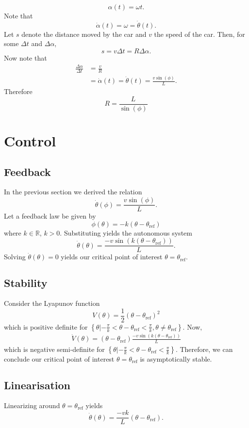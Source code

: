 \documentclass[11pt,titlepage]{report}
\begin{document}
\[
	\alpha(t) = \omega t.
\]
Note that
\[
	\dot{\alpha}(t) = \omega = \dot{\theta}(t).
\]
Let $s$ denote the distance moved by the car and $v$ the speed of the car. Then, for some $\Delta t$ and $\Delta \alpha$,
\[
	s = v \Delta t = R \Delta \alpha.
\]
Now note that
\begin{align*}
	\frac{\Delta \alpha}{\Delta t} &= \frac{v}{R} \\
	&=\dot{\alpha}(t)=\dot{\theta}(t) = \frac{v \sin{(\phi)}}{L}.
\end{align*}
Therefore
\begin{equation} \label{eq:steering-radius}
	R = \frac{L}{\sin{(\phi)}}
\end{equation}

\section*{Control}
\subsection*{Feedback}
In the previous section we derived the relation
\[
	\dot{\theta}(\phi) = \frac{v \sin{(\phi)}}{L}.
\]
Let a feedback law be given by
\[
	\phi(\theta) = -k(\theta-\theta_{\text{ref}})
\]
where $k \in \mathbb{R}$, $k > 0$. Substituting yields the autonomous system
\[
	\dot{\theta}(\theta) = \frac{- v \sin{(k (\theta-\theta_{\text{ref}}))}}{L}.
\]
Solving $\dot{\theta}(\theta)=0$ yields our critical point of interest $\theta=\theta_{\text{ref}}$.

\subsection*{Stability}
Consider the Lyapunov function
\[
	V(\theta) = \frac{1}{2}(\theta-\theta_{\text{ref}})^2
\]
which is positive definite for $\left\{\theta | -\frac{\pi}{k} < \theta-\theta_{\text{ref}} < \frac{\pi}{k}, \theta \neq \theta_{\text{ref}} \right\}$. Now,
\begin{align*}
	\dot{V}(\theta) = (\theta-\theta_{\text{ref}}) \frac{- v \sin{(k ({\theta-\theta_{\text{ref}}}))}}{L}
\end{align*}
which is negative semi-definite for $\left\{\theta | -\frac{\pi}{k} < \theta-\theta_{\text{ref}} < \frac{\pi}{k}\right\}$. Therefore, we can conclude our critical point of interest $\theta=\theta_{\text{ref}}$ is asymptotically stable.

\subsection*{Linearisation}
Linearizing around $\theta=\theta_{\text{ref}}$ yields
\[
	\dot{\theta}(\theta) = \frac{- v k}{L} (\theta-\theta_{\text{ref}}).
\]
\end{document}
